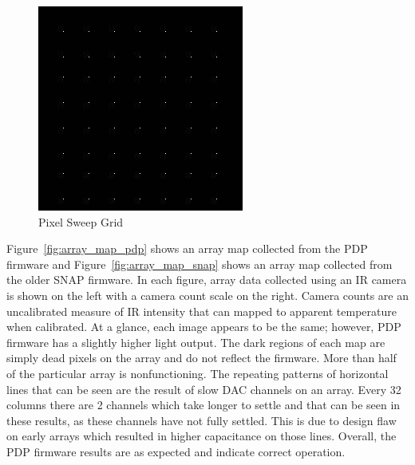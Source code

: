             \begin{figure}[t]
                \centering
                \includegraphics{fig/grid.jpg}
                \caption{Pixel Sweep Grid}
                \label{fig:grid_sweep}
            \end{figure}

            Figure~\ref{fig:array_map_pdp} shows an array map collected from the PDP firmware and Figure~\ref{fig:array_map_snap} shows an array map collected from the older SNAP firmware. In each figure, array data collected using an IR camera is shown on the left with a camera count scale on the right. Camera counts are an uncalibrated measure of IR intensity that can mapped to apparent temperature when calibrated. At a glance, each image appears to be the same; however, PDP firmware has a slightly higher light output. The dark regions of each map are simply dead pixels on the array and do not reflect the firmware. More than half of the particular array is nonfunctioning. The repeating patterns of horizontal lines that can be seen are the result of slow DAC channels on an array. Every 32 columns there are 2 channels which take longer to settle and that can be seen in these results, as these channels have not fully settled. This is due to design flaw on early arrays which resulted in higher capacitance on those lines. Overall, the PDP firmware results are as expected and indicate correct operation.


